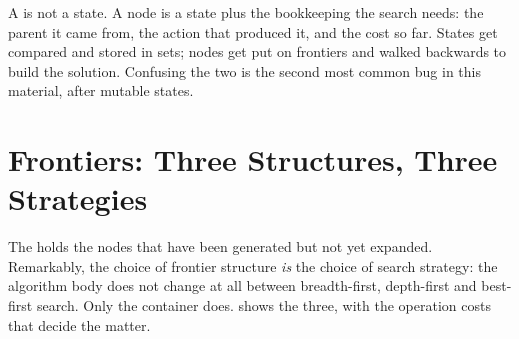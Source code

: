 A  is not a state. A node is a state plus the bookkeeping the search
needs: the parent it came from, the action that produced it, and the cost so far.
States get compared and stored in sets; nodes get put on frontiers and walked
backwards to build the solution. Confusing the two is the second most common bug in
this material, after mutable states.

\section{Frontiers: Three Structures, Three Strategies}

The  holds the nodes that have been generated but not yet expanded.
Remarkably, the choice of frontier structure \emph{is} the choice of search
strategy: the algorithm body does not change at all between breadth-first,
depth-first and best-first search. Only the container does.  shows
the three, with the operation costs that decide the matter.

